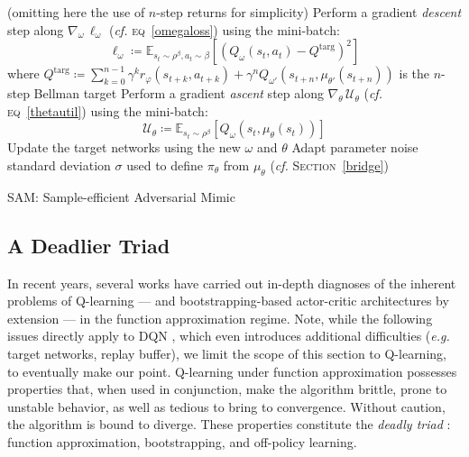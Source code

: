 \begin{algorithm}
{{{                (omitting here the use of $n$-step returns for simplicity)\;
            \SetNlSty{}{\textcolor{red}{$\diamond$}}{}
            Perform a gradient \emph{descent} step along
                $\nabla_\omega \, \ell_\omega$
                (\textit{cf.} \textsc{eq}~\ref{omegaloss})
                using the mini-batch:
                $$
                \ell_\omega \coloneqq \mathbb{E}_{s_t \sim \rho^\beta, a_t \sim \beta}[
                (Q_\omega(s_t, a_t)
                - Q^\text{targ})^2]
                $$
                where
                $Q^\text{targ} \coloneqq \sum_{k=0}^{n-1} \gamma^{k} r_\varphi(s_{t+k}, a_{t+k})
                + \gamma^n Q_{\omega'} (s_{t+n}, \mu_{\theta'}(s_{t+n}))$ is the $n$-step Bellman target\;
            Perform a gradient \emph{ascent} step along
                $\nabla_\theta \, \mathcal{U}_\theta$
                (\textit{cf.} \textsc{eq}~\ref{thetautil})
                using the mini-batch:
                $$
                \mathcal{U}_\theta \coloneqq
                \mathbb{E}_{s_t \sim \rho^\beta}
                [Q_\omega(s_t, \mu_\theta(s_t))]
                $$
                \;
            \SetNlSty{}{}{}
            Update the target networks using the new $\omega$ and $\theta$\;
        }
    }
    Adapt parameter noise standard deviation $\sigma$
    used to define $\pi_\theta$ from $\mu_\theta$ (\textit{cf.} \textsc{Section}~\ref{bridge})\;
}
\caption{SAM: Sample-efficient Adversarial Mimic}
\label{algosam}
\end{algorithm}
\DecMargin{1em}

\subsection{A Deadlier Triad}
\label{triad}
In recent years, several works
\cite{Fujimoto2018-pe,Fu2019-kb,Achiam2019-os}
have carried out in-depth diagnoses
of the inherent problems of Q-learning \cite{Watkins1989-ir,Watkins1992-gl}
--- and bootstrapping-based actor-critic architectures
by extension --- in the function approximation regime.
Note, while the following issues directly apply to DQN \cite{Mnih2013-rb,Mnih2015-iy},
which even introduces additional difficulties
(\textit{e.g.} target networks, replay buffer),
we limit the scope of this section to Q-learning, to eventually make our point.
Q-learning under function approximation possesses properties that,
when used in conjunction, make the algorithm brittle, prone to unstable behavior,
as well as tedious to bring to convergence.
Without caution, the algorithm is bound to diverge.
These properties constitute the \emph{deadly triad} \cite{Sutton1998-ow,Van_Hasselt2018-ql}:
function approximation, bootstrapping, and off-policy learning.

